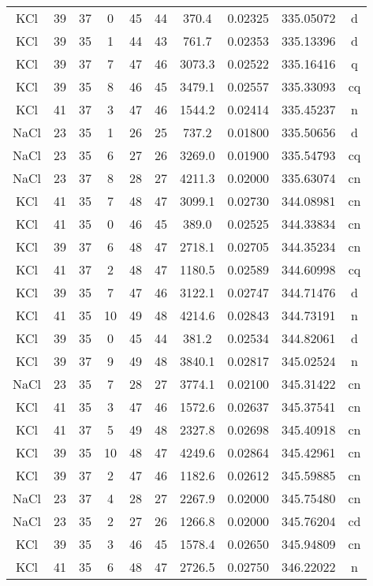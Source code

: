 \begin{table*}[htp]
\begin{tabular}{cccccccccc}
KCl & 39 & 37 & 0 & 45 & 44 & 370.4 & 0.02325 & 335.05072 & d \\
KCl & 39 & 35 & 1 & 44 & 43 & 761.7 & 0.02353 & 335.13396 & d \\
KCl & 39 & 37 & 7 & 47 & 46 & 3073.3 & 0.02522 & 335.16416 & q \\
KCl & 39 & 35 & 8 & 46 & 45 & 3479.1 & 0.02557 & 335.33093 & cq \\
KCl & 41 & 37 & 3 & 47 & 46 & 1544.2 & 0.02414 & 335.45237 & n \\
NaCl & 23 & 35 & 1 & 26 & 25 & 737.2 & 0.01800 & 335.50656 & d \\
NaCl & 23 & 35 & 6 & 27 & 26 & 3269.0 & 0.01900 & 335.54793 & cq \\
NaCl & 23 & 37 & 8 & 28 & 27 & 4211.3 & 0.02000 & 335.63074 & cn \\
KCl & 41 & 35 & 7 & 48 & 47 & 3099.1 & 0.02730 & 344.08981 & cn \\
KCl & 41 & 35 & 0 & 46 & 45 & 389.0 & 0.02525 & 344.33834 & cn \\
KCl & 39 & 37 & 6 & 48 & 47 & 2718.1 & 0.02705 & 344.35234 & cn \\
KCl & 41 & 37 & 2 & 48 & 47 & 1180.5 & 0.02589 & 344.60998 & cq \\
KCl & 39 & 35 & 7 & 47 & 46 & 3122.1 & 0.02747 & 344.71476 & d \\
KCl & 41 & 35 & 10 & 49 & 48 & 4214.6 & 0.02843 & 344.73191 & n \\
KCl & 39 & 35 & 0 & 45 & 44 & 381.2 & 0.02534 & 344.82061 & d \\
KCl & 39 & 37 & 9 & 49 & 48 & 3840.1 & 0.02817 & 345.02524 & n \\
NaCl & 23 & 35 & 7 & 28 & 27 & 3774.1 & 0.02100 & 345.31422 & cn \\
KCl & 41 & 35 & 3 & 47 & 46 & 1572.6 & 0.02637 & 345.37541 & cn \\
KCl & 41 & 37 & 5 & 49 & 48 & 2327.8 & 0.02698 & 345.40918 & cn \\
KCl & 39 & 35 & 10 & 48 & 47 & 4249.6 & 0.02864 & 345.42961 & cn \\
KCl & 39 & 37 & 2 & 47 & 46 & 1182.6 & 0.02612 & 345.59885 & cn \\
NaCl & 23 & 37 & 4 & 28 & 27 & 2267.9 & 0.02000 & 345.75480 & cn \\
NaCl & 23 & 35 & 2 & 27 & 26 & 1266.8 & 0.02000 & 345.76204 & cd \\
KCl & 39 & 35 & 3 & 46 & 45 & 1578.4 & 0.02650 & 345.94809 & cn \\
KCl & 41 & 35 & 6 & 48 & 47 & 2726.5 & 0.02750 & 346.22022 & n \\

\end{tabular}
\end{table*}
